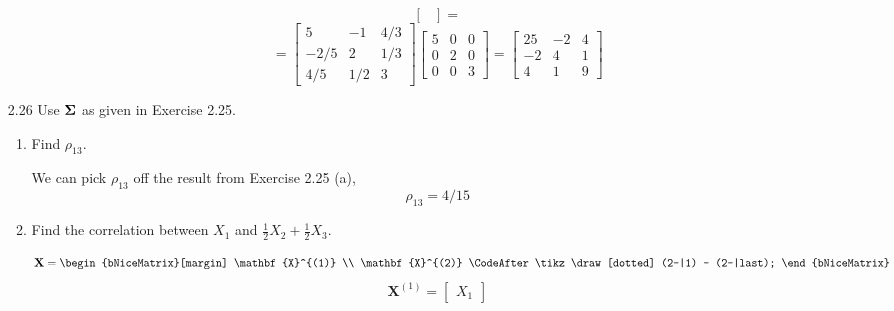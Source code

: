 \begin{enumerate}[font=\bfseries]
\begin{enumerate}
\[\begin{bmatrix}
                \end{bmatrix}
                =
            \]
            \[
                =
                \begin{bmatrix}
                    5 & -1 & 4/3 \\
                    -2/5 & 2 & 1/3 \\
                    4/5 & 1/2 & 3
                \end{bmatrix}
                \begin{bmatrix}
                    5 & 0 & 0 \\
                    0 & 2 & 0 \\
                    0 & 0 & 3   
                \end{bmatrix}
                =
                \begin{bmatrix}
                    25 & -2 & 4 \\
                    -2 & 4 & 1 \\
                    4 & 1 & 9
                \end{bmatrix}
            \]
        \end{enumerate}
        \item[2.26] Use $\bold{\Sigma}$ as given in Exercise 2.25.
        \begin{enumerate}
            \item Find $\rho_{13}$.
            \par
            We can pick $\rho_{13}$ off the result from Exercise 2.25 (a),
            \[
                \rho_{13} = 4/15
            \]
            \item Find the correlation between $X_1$ and $\frac{1}{2}X_2 + \frac{1}{2}X_3$.
            \par
            \[
                \mathbf{X}
                =
                \begin{bNiceMatrix}[margin]
                    \mathbf{X}^{(1)} \\
                    \mathbf{X}^{(2)}
                    \CodeAfter \tikz \draw[dotted] (2-|1) -- (2-|last);
                \end{bNiceMatrix}
            \]
            \[
                \mathbf{X}^{(1)}
                =
                \begin{bmatrix}
                    X_1
                \end{bmatrix}
\]
\end{enumerate}
\end{enumerate}
